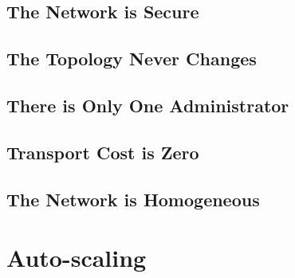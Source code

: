 \subsection{The Network is Secure}

\subsection{The Topology Never Changes}

\subsection{There is Only One Administrator}

\subsection{Transport Cost is Zero}

\subsection{The Network is Homogeneous}

\section{Auto-scaling}
